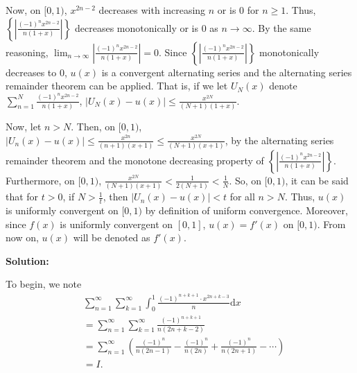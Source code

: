 \documentclass{article}
\begin{document}
Now, on $[0, 1)$, $x^{2n-2}$ decreases with increasing $n$ or is $0$ for $n \geq 1$. Thus, $\left\{\left|\frac{(-1)^nx^{2n-2}}{n(1+x)}\right|\right\}$ decreases monotonically or is $0$ as $n \to \infty$. By the same reasoning, $\displaystyle \lim_{n \to \infty} \left|\frac{(-1)^nx^{2n-2}}{n(1+x)}\right|  = 0$. Since $\left\{\left|\frac{(-1)^nx^{2n-2}}{n(1+x)}\right|\right\}$ monotonically decreases to 0, $u(x)$ is a convergent alternating series and the alternating series remainder theorem can be applied. That is, if we let $U_N(x)$ denote $\sum_{n=1}^{N} \frac{(-1)^nx^{2n-2}}{n(1+x)}$, $|U_N(x)-u(x)|\le \frac{x^{2N}}{(N+1)(1+x)}$. 

\vspace{5mm}

Now, let $n > N$. Then, on $[0, 1)$, $|U_n(x)-u(x)| \le \frac{x^{2n}}{(n+1)(x+1)} \leq \frac{x^{2N}}{(N+1)(x+1)}$, by the alternating series remainder theorem and the monotone decreasing property of $\left\{\left|\frac{(-1)^nx^{2n-2}}{n(1+x)}\right|\right\}$. Furthermore, on $[0, 1)$, $\frac{x^{2N}}{(N+1)(x+1)} < \frac{1}{2(N+1)} < \frac{1}{N}$. So, on $[0, 1)$, it can be said that for $t > 0$, if $N > \frac{1}{t}$, then $|U_n(x)-u(x)| < t$ for all $n > N$. Thus, $u(x)$ is uniformly convergent on $[0, 1)$ by definition of uniform convergence. Moreover, since $f(x)$ is uniformly convergent on $[0, 1]$, $u(x) = f'(x)$ on $[0, 1)$. From now on, $u(x)$ will be denoted as $f'(x)$.

\vspace{5mm}

\textbf{Solution:}


\vspace{5mm}

To begin, we note
\begin{align*}
    &\sum_{n=1}^{\infty}\sum_{k=1}^{\infty}\int_{0}^{1}\frac{ (-1)^{n+k+1}\cdot x^{2n+k-3}}{n} \mathrm{d}x \\
    &= \sum_{n=1}^{\infty}\sum_{k=1}^{\infty}\frac{ (-1)^{n+k+1}}{n(2n+k-2)}\\
    &= \sum_{n=1}^{\infty} \left(\frac{(-1)^n}{n(2n-1)}-\frac{(-1)^{n}}{n(2n)}+\frac{(-1)^n}{n(2n+1)}-\cdots\right)\\
    &= I.
\end{align*}
\end{document}
